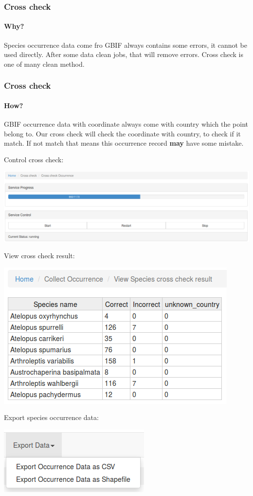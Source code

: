 \documentclass{beamer}
\begin{document}
\begin{frame}
	\frametitle{Cross check}
	\framesubtitle{Why?}
	Species occurrence data come fro GBIF always contains some errors, it cannot be used directly.
	\newline After some data clean jobs, that will remove errors. Cross check is one of many clean method.  
\end{frame}
\begin{frame}
	\frametitle{Cross check}
	\framesubtitle{How?}
	GBIF occurrence data with coordinate always come with country which the point belong to.
	Our cross check will check the coordinate with country, to check if it match.
	If not match that means this occurrence record \textbf{may} have some mistake.  
\end{frame}
\begin{frame}
	Control cross check:
	\begin{center}
		\includegraphics[scale=0.2]{image/control_cross_check.png}
	\end{center}
\end{frame}
\begin{frame}
	View cross check result:
	\begin{center}
		\includegraphics[scale=0.4]{image/view_cross_check.png}
	\end{center}
\end{frame}
\begin{frame}
	Export species occurrence data:
	\begin{center}
		\includegraphics[scale=0.4]{image/export_data.png}
	\end{center}
\end{frame}
\end{document}
